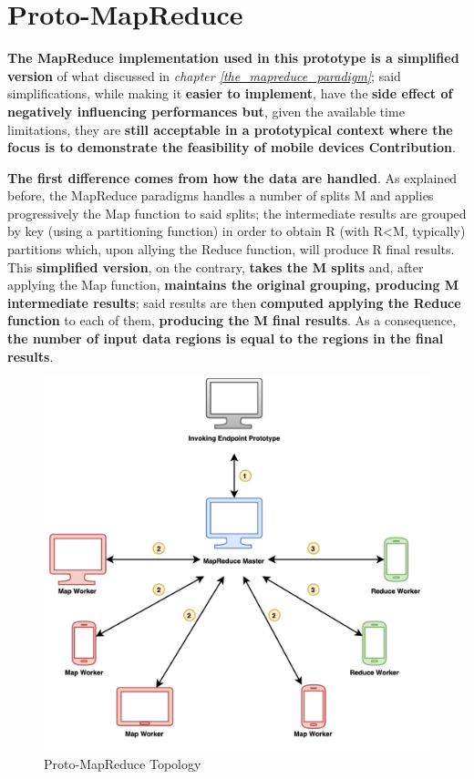 \section{Proto-MapReduce}
\textbf{The MapReduce implementation used in this prototype is a simplified version} of what discussed in \textit{chapter \ref{the_mapreduce_paradigm}}; said simplifications, while making it \textbf{easier to implement}, have the \textbf{side effect of negatively influencing performances but}, given the available time limitations, they are \textbf{still acceptable in a prototypical context where the focus is to demonstrate the feasibility of mobile devices Contribution}.

\textbf{The first difference comes from how the data are handled}. As explained before, the MapReduce paradigms handles a number of splits M and applies progressively the Map function to said splits; the intermediate results are grouped by key (using a partitioning function) in order to obtain R (with R<M, typically) partitions which, upon allying the Reduce function, will produce R final results. This \textbf{simplified version}, on the contrary, \textbf{takes the M splits} and, after applying the Map function, \textbf{maintains the original grouping, producing M intermediate results}; said results are then \textbf{computed applying the Reduce function} to each of them, \textbf{producing the M final results}. As a consequence, \textbf{the number of input data regions is equal to the regions in the final results}.

\vspace{10mm}

\begin{figure}[!ht]
    \centering
    \includegraphics[scale=1.18]{document/chapters/chapter_7/images/proto_mapreduce.png}
    \caption{Proto-MapReduce Topology}
    \label{fig:proto_mapreduce}
\end{figure}

